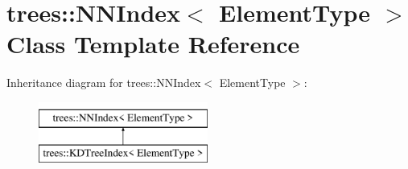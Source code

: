 \hypertarget{classtrees_1_1_n_n_index}{}\section{trees\+:\+:N\+N\+Index$<$ Element\+Type $>$ Class Template Reference}
\label{classtrees_1_1_n_n_index}
Inheritance diagram for trees\+:\+:N\+N\+Index$<$ Element\+Type $>$\+:\begin{figure}[H]
\begin{center}
\leavevmode
\includegraphics[height=2.000000cm]{classtrees_1_1_n_n_index}
\end{center}
\end{figure}
